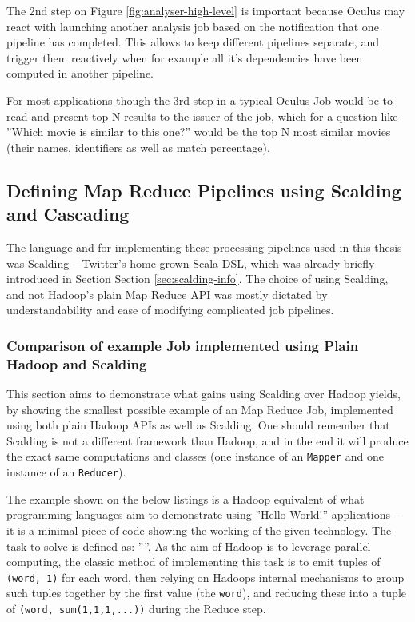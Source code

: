 The 2nd step on Figure \ref{fig:analyser-high-level} is important because Oculus may react with launching another analysis job based on the notification that one pipeline has completed. This allows to keep different pipelines separate, and trigger them reactively when for example all it's dependencies have been computed in another pipeline.

For most applications though the 3rd step in a typical Oculus Job would be to read and present top N results to the issuer of the job, which for a question like ''Which movie is similar to this one?'' would be the top N most similar movies (their names, identifiers as well as match percentage).


\subsection{Defining Map Reduce Pipelines using Scalding and Cascading}
\label{sec:scalding-jobs}
The language and for implementing these processing pipelines used in this thesis was Scalding -- Twitter's home grown Scala DSL, which was already briefly introduced in Section Section \ref{sec:scalding-info}. The choice of using Scalding, and not Hadoop's plain Map Reduce API was mostly dictated by understandability and ease of modifying complicated job pipelines. 

\subsubsection{Comparison of example Job implemented using Plain Hadoop and Scalding}

This section aims to demonstrate what gains using Scalding over Hadoop yields, by showing the smallest possible example of an Map Reduce Job, implemented using both plain Hadoop APIs as well as Scalding. One should remember that Scalding is not a different framework than Hadoop, and in the end it will produce the exact same computations and classes (one instance of an \verb|Mapper| and one instance of an \verb|Reducer|).

The example shown on the below listings is a Hadoop equivalent of what programming languages aim to demonstrate using ''Hello World!'' applications -- it is a minimal piece of code showing the working of the given technology. The task to solve is defined as: ''''. As the aim of Hadoop is to leverage parallel computing, the classic method of implementing this task is to emit tuples of \verb|(word, 1)| for each word, then relying on Hadoops internal mechanisms to group such tuples together by the first value (the \verb|word|), and reducing these into a tuple of \verb|(word, sum(1,1,1,...))| during the Reduce step.

